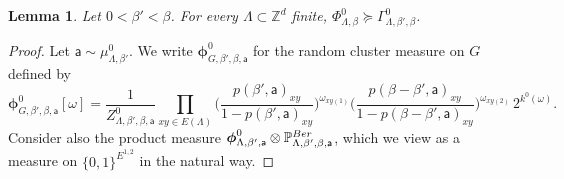 \documentclass[11pt,a4paper]{article}
\newtheorem{lemma}[theorem]{Lemma}
\theoremstyle{definition}
\numberwithin{equation}{section}
\begin{document}
\begin{lemma}\label{lem: dom random intensity}
Let $0<\beta'<\beta$. For every $\Lambda\subset \mathbb{Z}^d$ finite, $\Phi^0_{\Lambda,\beta} \succcurlyeq \Gamma^0_{\Lambda,\beta',\beta}$.
\end{lemma}

\begin{proof}
Let $\mathsf{a}\sim \mu^0_{\Lambda,\beta'}$. We write
$\boldsymbol{\phi}^0_{G,\beta',\beta,\mathsf{a}}$ for the random cluster measure on $G$ defined by
\begin{equation}
\boldsymbol{\phi}^0_{G,\beta',\beta,\mathsf{a}}[\omega]
=
\frac{1}{Z^0_{\Lambda,\beta',\beta, \mathsf{a}}}\prod_{xy \in E(\Lambda)} \Big(\frac{p(\beta',\mathsf{a})_{xy}}{1-p(\beta',\mathsf{a})_{xy}}\Big)^{\omega_{xy(1)}}  \Big(\frac{p(\beta-\beta',\mathsf{a})_{xy}}{1-p(\beta-\beta',\mathsf{a})_{xy}}\Big)^{\omega_{xy(2)}}  \, 2^{k^0(\omega)}.
\end{equation}
Consider also the product measure $\boldsymbol{\phi}^0_{\Lambda,\beta',\mathsf{a}}\otimes \mathbb{P}^{\rm Ber}_{\Lambda,\beta',\beta,\mathsf{a}}$, which we view as a measure on $\{0,1\}^{E^{1,2}}$ in the natural way. 


\end{proof}
\end{document}
